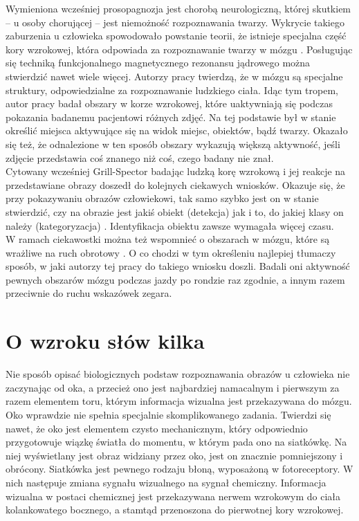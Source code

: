 Wymieniona wcześniej prosopagnozja jest chorobą neurologiczną, której skutkiem -- u osoby chorującej -- jest niemożność rozpoznawania twarzy. Wykrycie takiego zaburzenia u człowieka spowodowało powstanie teorii, że istnieje specjalna część kory wzrokowej, która odpowiada za rozpoznawanie twarzy w mózgu \cite{Gauthier1999}. Posługując się techniką funkcjonalnego magnetycznego rezonansu jądrowego można stwierdzić nawet wiele więcej. Autorzy pracy \cite{Downing2001} twierdzą, że w mózgu są specjalne struktury, odpowiedzialne za rozpoznawanie ludzkiego ciała. Idąc tym tropem, autor pracy \cite{Grill-Spector2003} badał obszary w korze wzrokowej, które uaktywniają się podczas pokazania badanemu pacjentowi różnych zdjęć. Na tej podstawie był w stanie określić miejsca aktywujące się na widok miejsc, obiektów, bądź twarzy. Okazało się też, że odnalezione w ten sposób obszary wykazują większą aktywność, jeśli zdjęcie przedstawia coś znanego niż coś, czego badany nie znał.\\
Cytowany wcześniej Grill-Spector badając ludzką korę wzrokową i jej reakcje na przedstawiane obrazy doszedł do kolejnych ciekawych wniosków. Okazuje się, że przy pokazywaniu obrazów człowiekowi, tak samo szybko jest on w stanie stwierdzić, czy na obrazie jest jakiś obiekt (detekcja) jak i to, do jakiej klasy on należy (kategoryzacja) \cite{Grill-Spector2005}. Identyfikacja obiektu zawsze wymagała więcej czasu.\\

W ramach ciekawostki można też wspomnieć o obszarach w mózgu, które są wrażliwe na ruch obrotowy \cite{kahana2010}. O co chodzi w tym określeniu najlepiej tłumaczy sposób, w jaki autorzy tej pracy do takiego wniosku doszli. Badali oni aktywność pewnych obszarów mózgu podczas jazdy po rondzie raz zgodnie, a innym razem przeciwnie do ruchu wskazówek zegara. 

\section{O wzroku słów kilka}
\label{oWzrokuSlowKilka}
Nie sposób opisać biologicznych podstaw rozpoznawania obrazów u człowieka nie zaczynając od oka, a przecież ono jest najbardziej namacalnym i pierwszym za razem elementem toru, którym informacja wizualna jest przekazywana do mózgu.\\
Oko wprawdzie nie spełnia specjalnie skomplikowanego zadania. Twierdzi się nawet, że oko jest elementem czysto mechanicznym, który odpowiednio przygotowuje wiązkę światła do momentu, w którym pada ono na siatkówkę. Na niej wyświetlany jest obraz widziany przez oko, jest on znacznie pomniejszony i obrócony. Siatkówka jest pewnego rodzaju błoną, wyposażoną w fotoreceptory. W nich następuje zmiana sygnału wizualnego na sygnał chemiczny. Informacja wizualna w postaci chemicznej jest przekazywana nerwem wzrokowym do ciała kolankowatego bocznego, a stamtąd przenoszona do pierwotnej kory wzrokowej.

